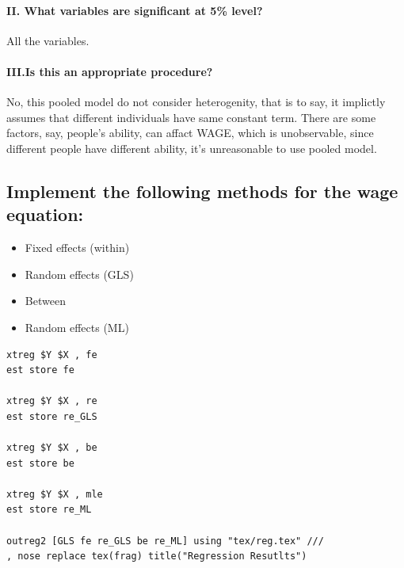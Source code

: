 \documentclass{article}
\begin{document}
\paragraph{II. What variables are significant at 5\% level? \\}  
All the variables.
\paragraph{III.Is this an appropriate procedure?\\}  
No, this pooled model do not consider heterogenity, that is to say,
it implictly assumes that different individuals have same constant 
term. There are some factors, say, people's ability, can affact WAGE,
which is unobservable, since different people have different ability,
it's unreasonable to use pooled model.

\subsection{Implement the following methods for the wage equation:}
\begin{itemize}
	\item Fixed effects (within)
	\item Random effects (GLS)
	\item Between
	\item Random effects (ML)
\end{itemize}
\begin{lstlisting}
xtreg $Y $X , fe
est store fe

xtreg $Y $X , re
est store re_GLS

xtreg $Y $X , be
est store be

xtreg $Y $X , mle
est store re_ML

outreg2 [GLS fe re_GLS be re_ML] using "tex/reg.tex" ///
, nose replace tex(frag) title("Regression Resutlts")		
\end{lstlisting}

	
\end{document}

